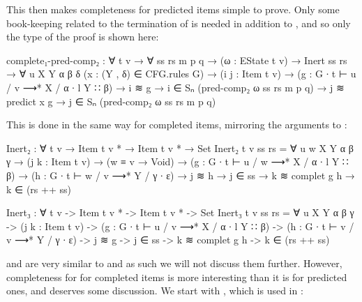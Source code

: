 		This then makes completeness for  predicted items
		simple to prove. Only some book-keeping related to the termination of
		 is needed in addition to , and so
		only the type of the proof is shown here:

		\begin{code}
			  complete₁-pred-comp₂ : ∀ {t v} → ∀ ss rs m p q →
			    (ω : EState t v) →
			    Inert ss rs →
			    ∀ {u X Y α β δ}
			    (x : (Y , δ) ∈ CFG.rules G) →
			    (i j : Item t v) →
			    (g : G ∙ t ⊢ u / v ⟶* X / α ∙ l Y ∷ β) →
			    i ≋ g → 
			    i ∈ Sₙ (pred-comp₂ ω ss rs m p q) →
			    j ≋ predict x g →
			      j ∈ Sₙ (pred-comp₂ ω ss rs m p q)
		\end{code}

		This is done in the same way for completed items, mirroring the
		arguments to :

		\begin{code}
			  Inert₂ : ∀ {t v} → Item t v * → Item t v * → Set
			  Inert₂ {t} {v} ss rs =
			    ∀ {u w X Y α β γ} →
			    (j k : Item t v) →
			    (w ≡ v → Void) →
			    (g : G ∙ t ⊢ u / w ⟶* X / α ∙ l Y ∷ β) →
			    (h : G ∙ t ⊢ w / v ⟶* Y / γ ∙ ε) →
			    j ≋ h → j ∈ ss →
			    k ≋ complet g h →
			      k ∈ (rs ++ ss)

			  Inert₃ : ∀ {t v} -> Item t v * -> Item t v * -> Set
			  Inert₃ {t} {v} ss rs =
			    ∀ {u X Y α β γ} ->
			    (j k : Item t v) ->
			    (g : G ∙ t ⊢ u / v ⟶* X / α ∙ l Y ∷ β) ->
			    (h : G ∙ t ⊢ v / v ⟶* Y / γ ∙ ε) ->
			    j ≋ g -> j ∈ ss ->
			    k ≋ complet g h ->
			      k ∈ (rs ++ ss)
		\end{code}

		 and  are very similar to
		 and as such we will not discuss them further. However,
		completeness for  for completed items is more
		interesting than it is for predicted ones, and deserves some
		discussion. We start with , which is used
		in :
		
